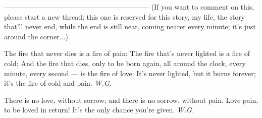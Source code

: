 --------------------------------------------------------------
(If you want to comment on this, please start a new thread; this one is reserved for this story, my life, the story that'll never end, while the end is still near, coming nearer every minute; it's just around the corner...)

The fire 
that never dies 
is a fire of pain; 
The fire 
that's never lighted 
is a fire of cold;
And the fire 
that dies, 
only to be born again, 
all around the clock, 
every minute, 
every second --- 
is the fire of love: 
It's never lighted, 
but it burns forever; 
it's the fire of cold and pain. 
\emph{W.G.}

There is no love, 
without sorrow; 
and there is no sorrow, 
without pain. 
Love pain, 
to be loved in return! 
It's the only chance you're given. 
\emph{W.G.}
